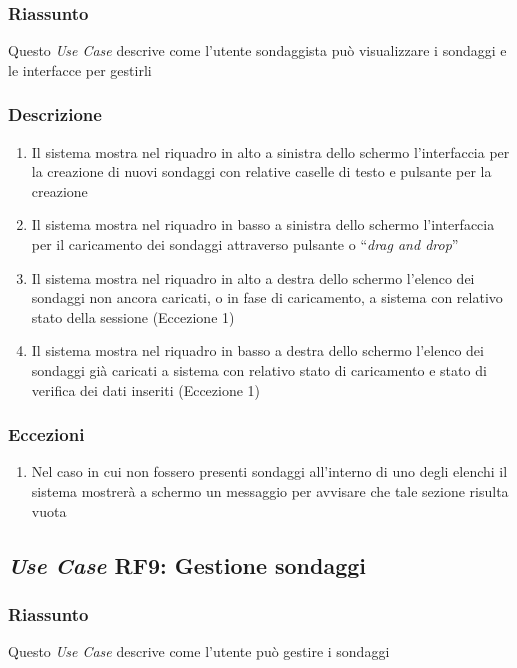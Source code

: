         \subsubsection{Riassunto}
            Questo \textit{Use Case} descrive come l'utente sondaggista può visualizzare i sondaggi e le interfacce per gestirli
        \subsubsection{Descrizione}
            \begin{enumerate}
                \item Il sistema mostra nel riquadro in alto a sinistra dello schermo l'interfaccia per la creazione di nuovi sondaggi con relative caselle di testo e pulsante per la creazione
                \item Il sistema mostra nel riquadro in basso a sinistra dello schermo l'interfaccia per il caricamento dei sondaggi attraverso pulsante o ``\textit{drag and drop}''
                \item Il sistema mostra nel riquadro in alto a destra dello schermo l'elenco dei sondaggi non ancora caricati, o in fase di caricamento, a sistema con relativo stato della sessione (Eccezione 1)
                \item Il sistema mostra nel riquadro in basso a destra dello schermo l'elenco dei sondaggi già caricati a sistema con relativo stato di caricamento e stato di verifica dei dati inseriti (Eccezione 1)
            \end{enumerate}
        \subsubsection{Eccezioni}
            \begin{enumerate}
                \item Nel caso in cui non fossero presenti sondaggi all'interno di uno degli elenchi il sistema mostrerà a schermo un messaggio per avvisare che tale sezione risulta vuota
            \end{enumerate}

    \subsection{\textit{Use Case} RF9: Gestione sondaggi}
        \subsubsection{Riassunto}
            Questo \textit{Use Case} descrive come l'utente può gestire i sondaggi

